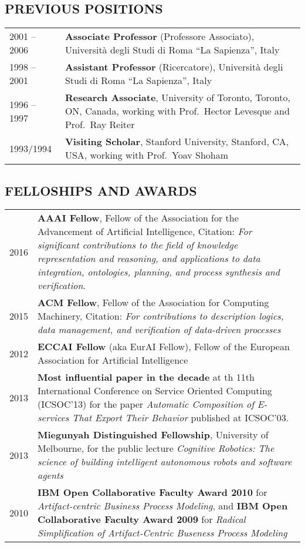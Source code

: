 \subsection*{PREVIOUS POSITIONS}
\vspace{-1ex}
\begin{tabular}{p{2cm}p{14cm}}
  2001 -- 2006\ & \textbf{Associate Professor} (Professore Associato), Universit\`a degli Studi di Roma ``La Sapienza'', Italy\\
  1998 -- 2001 & \textbf{Assistant Professor} (Ricercatore), Universit\`a degli Studi di Roma ``La Sapienza'', Italy\\
1996 -- 1997 & \textbf{Research Associate}, University of Toronto, Toronto, ON,  Canada, working with Prof.\ Hector Levesque and Prof.\ Ray Reiter\\
1993/1994 & \textbf{Visiting Scholar}, Stanford University, Stanford, CA, USA,  working with Prof.\ Yoav Shoham
\end{tabular}

\vspace{-1ex}
\subsection*{FELLOSHIPS AND AWARDS}
\vspace{-1ex}
\begin{tabular}{p{2cm}p{14cm}}
2016 & \textbf{AAAI Fellow}, Fellow of the Association for the Advancement of Artificial Intelligence,
Citation: \emph{For significant contributions to the field of knowledge representation and reasoning, and applications to data integration, ontologies, planning, and process synthesis and verification}.
\\
2015 & \textbf{ACM Fellow}, Fellow of the Association for Computing Machinery, Citation: \emph{For contributions to description logics, data management, and verification of data-driven processes}\\
2012 & \textbf{ECCAI Fellow} (aka EurAI Fellow),  Fellow of the European Association for Artificial Intelligence\\
2013 & \textbf{Most influential paper in the decade} at th 11th International Conference on Service Oriented Computing (ICSOC'13) for the paper \emph{Automatic Composition of E-services That Export Their Behavior} published at ICSOC’03.\\
2013 & \textbf{Miegunyah Distinguished Fellowship}, University of Melbourne, for the public lecture \emph{Cognitive Robotics: The science of building intelligent autonomous robots and software agents}\\
2010 & \textbf{IBM Open Collaborative Faculty Award 2010} for \emph{Artifact-centric Business Process Modeling}, and 
\textbf{IBM Open Collaborative Faculty Award 2009} for \emph{Radical Simplification of Artifact-Centric Buseness Process Modeling}
\end{tabular}

